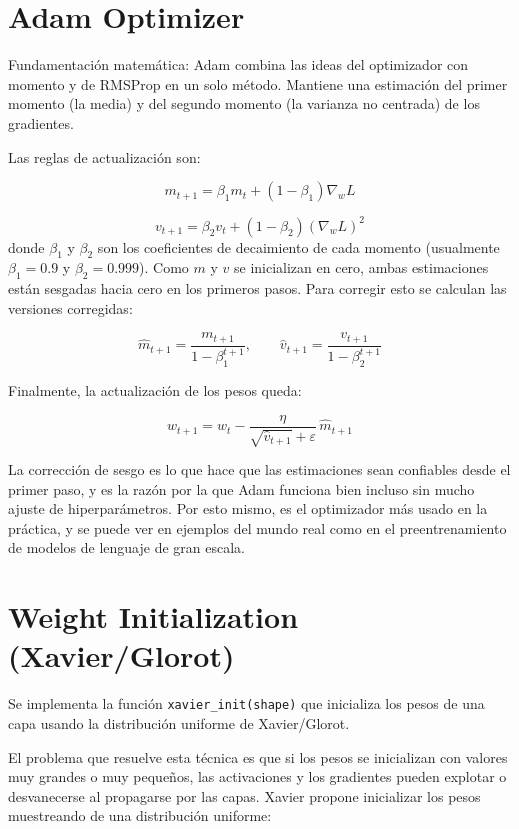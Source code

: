\documentclass[12pt, letterpaper]{article}
\begin{document}
\newpage

\section{Adam Optimizer}


Fundamentación matemática: Adam combina las ideas del optimizador con momento y de RMSProp en un solo método. Mantiene una estimación del primer momento (la media) y del segundo momento (la varianza no centrada) de los gradientes.

Las reglas de actualización son:

\[
m_{t+1} = \beta_1 m_t + (1-\beta_1)\nabla_w L
\]

\[
v_{t+1} = \beta_2 v_t + (1-\beta_2)(\nabla_w L)^2
\]
donde $\beta_1$ y $\beta_2$ son los coeficientes de decaimiento de cada momento (usualmente $\beta_1=0.9$ y $\beta_2=0.999$). Como $m$ y $v$ se inicializan en cero, ambas estimaciones están sesgadas hacia cero en los primeros pasos. Para corregir esto se calculan las versiones corregidas:

\[
\hat{m}_{t+1} = \frac{m_{t+1}}{1-\beta_1^{t+1}}, \qquad \hat{v}_{t+1} = \frac{v_{t+1}}{1-\beta_2^{t+1}}
\]

Finalmente, la actualización de los pesos queda:

\[
w_{t+1} = w_t - \frac{\eta}{\sqrt{\hat{v}_{t+1}}+\varepsilon}\, \hat{m}_{t+1}
\]

La corrección de sesgo es lo que hace que las estimaciones sean confiables desde el primer paso, y es la razón por la que Adam funciona bien incluso sin mucho ajuste de hiperparámetros. Por esto mismo, es el optimizador más usado en la práctica, y se puede ver en ejemplos del mundo real como en el preentrenamiento de modelos de lenguaje de gran escala.

\newpage

\section{Weight Initialization (Xavier/Glorot)}

Se implementa la función \texttt{xavier\_init(shape)} que inicializa los pesos
de una capa usando la distribución uniforme de Xavier/Glorot.

El problema que resuelve esta técnica es que si los pesos se inicializan con
valores muy grandes o muy pequeños, las activaciones y los gradientes pueden
explotar o desvanecerse al propagarse por las capas. Xavier propone inicializar
los pesos muestreando de una distribución uniforme:
\end{document}
